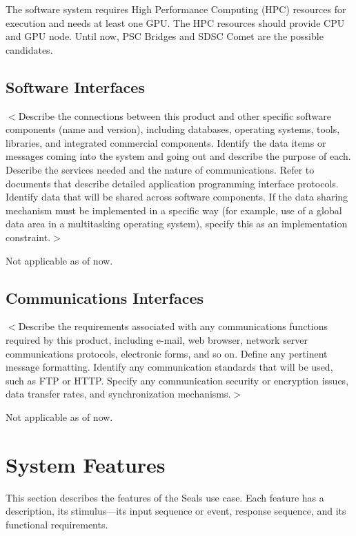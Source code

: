 \documentclass{scrreprt}
\begin{document}
The software system requires High Performance Computing (HPC) resources for execution 
and needs at least one GPU. The HPC resources should provide CPU and GPU node. 
Until now, PSC Bridges and SDSC Comet are the possible candidates.

\section{Software Interfaces}
$<$Describe the connections between this product and other specific software 
components (name and version), including databases, operating systems, tools, 
libraries, and integrated commercial components. Identify the data items or 
messages coming into the system and going out and describe the purpose of each.  
Describe the services needed and the nature of communications. Refer to 
documents that describe detailed application programming interface protocols.  
Identify data that will be shared across software components. If the data 
sharing mechanism must be implemented in a specific way (for example, use of a 
global data area in a multitasking operating system), specify this as an 
implementation constraint.$>$

Not applicable as of now.


\section{Communications Interfaces}
$<$Describe the requirements associated with any communications functions 
required by this product, including e-mail, web browser, network server 
communications protocols, electronic forms, and so on. Define any pertinent 
message formatting. Identify any communication standards that will be used, such 
as FTP or HTTP. Specify any communication security or encryption issues, data 
transfer rates, and synchronization mechanisms.$>$

Not applicable as of now.

\chapter{System Features}
\iffalse
$<$This template illustrates organizing the functional requirements for the 
product by system features, the major services provided by the product. You may 
prefer to organize this section by use case, mode of operation, user class, 
object class, functional hierarchy, or combinations of these, whatever makes the 
most logical sense for your product.$>$
\fi
This section describes the features of the Seals use case. Each feature has a
description, its stimulus---its input sequence or event, response sequence, and
its functional requirements.
\end{document}
